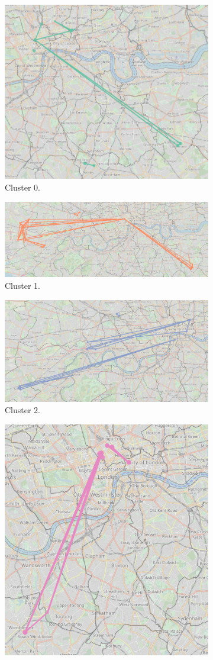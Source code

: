 \documentclass{article}
\theoremstyle{remark}
\begin{document}
\begin{figure}[!h]

\centering
\begin{subfigure}{0.6\textheight}
\centering
\includegraphics[width=0.4\linewidth]{figures/daytime_locals_c0.png}
\caption{Cluster 0.}
\label{fig:daytime_locals_c0}
\end{subfigure}
\begin{subfigure}{0.6\textheight}
\centering
\includegraphics[width=0.4\linewidth]{figures/daytime_locals_c1.png}
\caption{Cluster 1.}
\label{fig:daytime_locals_c1}
\end{subfigure}
\begin{subfigure}{0.6\textheight}
\centering
\includegraphics[width=0.4\linewidth]{figures/daytime_locals_c2.png}
\caption{Cluster 2.}
\label{fig:daytime_locals_c2}
\end{subfigure}
\begin{subfigure}{0.6\textheight}
\centering
\includegraphics[width=0.4\linewidth]{figures/daytime_locals_c3.png}

\end{subfigure}
\end{figure}
\end{document}
